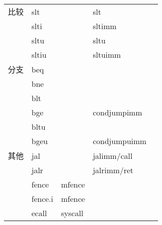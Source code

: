 \begin{longtable}{lllll}
                               \hline
    比较                         & slt                              &                              & slt                            \\
                               & slti                             &                              & sltimm                         \\
                               & sltu                             &                              & sltu                           \\
                               & sltiu                            &                              & sltuimm                        \\
                               \hline
    分支                       & beq                              &                              &                                \\
                               & bne                              &                              &                                \\
                               & blt                              &                              &                                \\
                              & bge                              & \multirow{-4}{*}{}           & \multirow{-4}{*}{condjumpimm}  \\
                               & bltu                             &                              &                                \\
                              & bgeu                             & \multirow{-2}{*}{}           & \multirow{-2}{*}{condjumpuimm} \\
    \hline
    其他                         & jal                              &                              & jalimm/call            \\
                               & jalr                             &                              & jalrimm/ret                 \\
                               & fence                            & mfence                       &                                \\
                               & fence.i                          & mfence                       &                                \\
                               & ecall                            & syscall                      &                                \\

\end{longtable}
